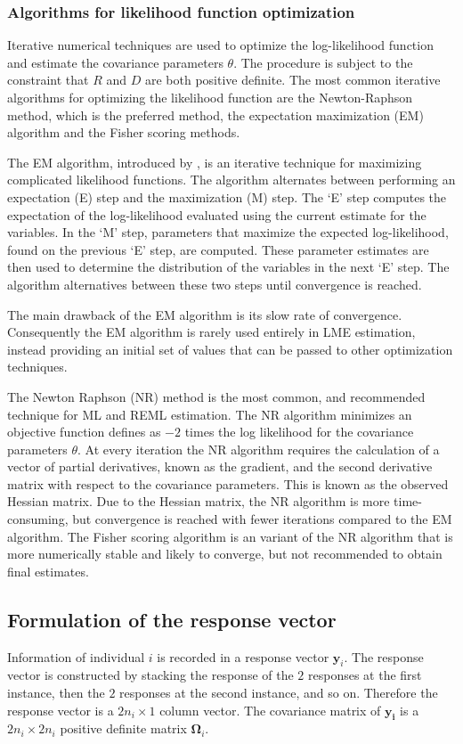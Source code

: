 \documentclass[12pt, a4paper]{report}
\theoremstyle{plain}
\theoremstyle{definition}
\theoremstyle{remark}
\begin{document}
	\subsubsection{Algorithms for likelihood function optimization}Iterative numerical techniques are used to optimize the log-likelihood function and estimate the covariance parameters $\theta$. The procedure is subject to the constraint that $R$ and $D$ are both positive definite. The most common iterative algorithms for optimizing the likelihood function are the Newton-Raphson method, which is the preferred method, the expectation maximization (EM) algorithm and the Fisher scoring methods.
	
	The EM algorithm, introduced by \citet{EM}, is an iterative technique for maximizing complicated likelihood functions. The algorithm alternates between performing an expectation (E) step
	and the maximization (M) step. The `E' step computes the expectation of the log-likelihood evaluated using the current
	estimate for the variables. In the `M' step, parameters that maximize the expected log-likelihood, found on the previous `E' step, are computed. These parameter estimates are then used to determine the distribution of the variables in the next `E' step. The algorithm alternatives between these two steps until convergence is reached.
	
	The main drawback of the EM algorithm is its slow rate of
	convergence. Consequently the EM algorithm is rarely used entirely in LME estimation,
	instead providing an initial set of values that can be passed to
	other optimization techniques.
	
	The Newton Raphson (NR) method is the most common, and recommended technique for ML and
	REML estimation. The NR algorithm minimizes an objective function defines as $-2$ times the log likelihood for the covariance parameters $\theta$. At every iteration the NR algorithm requires the
	calculation of a vector of partial derivatives, known as the gradient, and the second derivative matrix with respect to the covariance parameters. This is known as the observed Hessian matrix. Due to the Hessian matrix, the NR algorithm is more time-consuming, but convergence is reached with fewer iterations compared to the EM algorithm. The Fisher scoring algorithm is an variant of the NR algorithm that is more numerically stable and likely to converge, but not recommended to obtain final estimates.
	
	
	\subsection{Formulation of the response vector}
	Information of individual $i$ is recorded in a response vector $\boldsymbol{y}_{i}$. The response vector is constructed by stacking the response of the $2$ responses at the first instance, then the $2$ responses at the second instance, and so on. Therefore the response vector is a $2n_{i} \times 1$ column vector.
	The covariance matrix of $\boldsymbol{y_{i}}$ is a $2n_{i} \times 2n_{i}$ positive definite matrix $\boldsymbol{\Omega}_{i}$.
	
\end{document}
